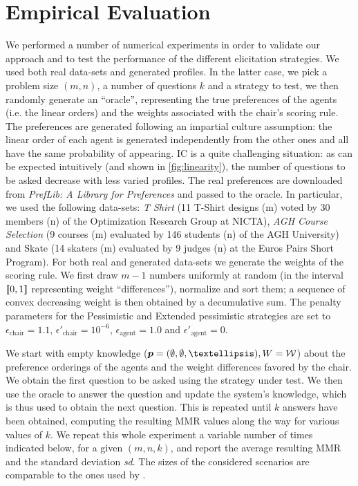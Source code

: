 \documentclass{article}
\begin{document}
\section{Empirical Evaluation} 
\label{sec:experiments}
We  performed a number of numerical experiments in order to validate our approach and to test the performance of the different elicitation strategies. %
We used both real data-sets and generated profiles. In the latter case, we pick a problem size $(m, n)$, a number of questions $k$ and a strategy to test, we then randomly generate an “oracle”, representing the true preferences of the agents (i.e. the linear orders) and the weights associated with the chair's scoring rule. 
The preferences are generated following an impartial culture assumption: the linear order of each agent is generated independently from the other ones and all have the same probability of appearing. IC is a quite challenging situation: as can be expected intuitively (and shown in \cref{fig:linearity}), the number of questions to be asked decrease with less varied profiles. The real preferences are downloaded from \textit{PrefLib: A Library for Preferences} \citep{PrefLib} and passed to the oracle. In particular, we used the following data-sets: \textit{T Shirt} (11 T-Shirt designs (m) voted by 30 members (n) of the Optimization Research Group at NICTA), \textit{AGH Course Selection} (9 courses (m) evaluated by 146 students (n) of the AGH University) and Skate (14 skaters (m) evaluated by 9 judges (n) at the Euros Pairs Short Program).
For both real and generated data-sets we generate the weights of the scoring rule. We first draw $m - 1$ numbers uniformly at random (in the interval $\llbracket 0,1 \rrbracket$ representing weight ``differences''), normalize and sort them; a sequence of convex decreasing weight is then obtained by a decumulative sum.
The penalty parameters for the Pessimistic and Extended pessimistic strategies are set to $\epsilon_{\text{chair}} = 1.1$, $\epsilon'_{\text{chair}} = 10^{-6}$, $\epsilon_{\text{agent}} = 1.0$ and $\epsilon'_{\text{agent}} = 0$.

We start with empty knowledge ($\pprofile = (\emptyset, \emptyset, …), W = \W$) about the preference orderings of the agents and the weight differences favored by the chair. We obtain the first question to be asked using the strategy under test. We then use the oracle to answer the question and update the system's knowledge, which is thus used to obtain the next question. This is repeated until $k$ answers have been obtained, computing the resulting MMR values along the way for various values of $k$. We repeat this whole experiment a variable number of times indicated below, for a given $(m, n, k)$, and report the average resulting MMR and the standard deviation \textit{sd}. The sizes of the considered scenarios are comparable to the ones used by \citet{Cailloux2014}. 
\end{document}
